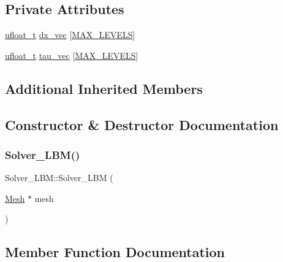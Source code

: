 \subsection*{Private Attributes}
\begin{DoxyCompactItemize}
\item 
\hyperlink{cppspec_8h_af529d360dfac9b9578aa719418a53a21}{ufloat\+\_\+t} \hyperlink{classSolver__LBM_a1ece0e58740be29fcaea526f7da7fe4a}{dx\+\_\+vec} \mbox{[}\hyperlink{cppspec_8h_add784659439a8dd6b1423406171414d3}{M\+A\+X\+\_\+\+L\+E\+V\+E\+LS}\mbox{]}
\item 
\hyperlink{cppspec_8h_af529d360dfac9b9578aa719418a53a21}{ufloat\+\_\+t} \hyperlink{classSolver__LBM_ad5b36057b2d1db724ff10f4dd6b59105}{tau\+\_\+vec} \mbox{[}\hyperlink{cppspec_8h_add784659439a8dd6b1423406171414d3}{M\+A\+X\+\_\+\+L\+E\+V\+E\+LS}\mbox{]}
\end{DoxyCompactItemize}
\subsection*{Additional Inherited Members}


\subsection{Constructor \& Destructor Documentation}
\mbox{\label{classSolver__LBM_a8fed041efa5cee6ff2eaba9c23406074}} 
\subsubsection{\texorpdfstring{Solver\+\_\+\+L\+B\+M()}{Solver\_LBM()}}
{\footnotesize\ttfamily Solver\+\_\+\+L\+B\+M\+::\+Solver\+\_\+\+L\+BM (\begin{DoxyParamCaption}\item[{\hyperlink{classMesh}{Mesh} $\ast$}]{mesh }\end{DoxyParamCaption})\hspace{0.3cm}{\ttfamily [inline]}}



\subsection{Member Function Documentation}
\mbox{\label{classSolver__LBM_a9f5927018c5068edc1f31ead745a6e05}} 
